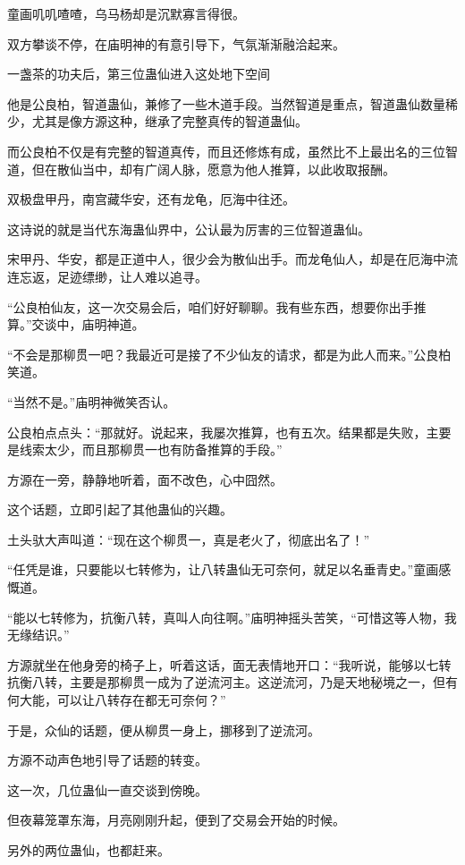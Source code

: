\begin{this_body}
童画叽叽喳喳，乌马杨却是沉默寡言得很。

双方攀谈不停，在庙明神的有意引导下，气氛渐渐融洽起来。

一盏茶的功夫后，第三位蛊仙进入这处地下空间

他是公良柏，智道蛊仙，兼修了一些木道手段。当然智道是重点，智道蛊仙数量稀少，尤其是像方源这种，继承了完整真传的智道蛊仙。

而公良柏不仅是有完整的智道真传，而且还修炼有成，虽然比不上最出名的三位智道，但在散仙当中，却有广阔人脉，愿意为他人推算，以此收取报酬。

双极盘甲丹，南宫藏华安，还有龙龟，厄海中往还。

这诗说的就是当代东海蛊仙界中，公认最为厉害的三位智道蛊仙。

宋甲丹、华安，都是正道中人，很少会为散仙出手。而龙龟仙人，却是在厄海中流连忘返，足迹缥缈，让人难以追寻。

“公良柏仙友，这一次交易会后，咱们好好聊聊。我有些东西，想要你出手推算。”交谈中，庙明神道。

“不会是那柳贯一吧？我最近可是接了不少仙友的请求，都是为此人而来。”公良柏笑道。

“当然不是。”庙明神微笑否认。

公良柏点点头：“那就好。说起来，我屡次推算，也有五次。结果都是失败，主要是线索太少，而且那柳贯一也有防备推算的手段。”

方源在一旁，静静地听着，面不改色，心中囧然。

这个话题，立即引起了其他蛊仙的兴趣。

土头驮大声叫道：“现在这个柳贯一，真是老火了，彻底出名了！”

“任凭是谁，只要能以七转修为，让八转蛊仙无可奈何，就足以名垂青史。”童画感慨道。

“能以七转修为，抗衡八转，真叫人向往啊。”庙明神摇头苦笑，“可惜这等人物，我无缘结识。”

方源就坐在他身旁的椅子上，听着这话，面无表情地开口：“我听说，能够以七转抗衡八转，主要是那柳贯一成为了逆流河主。这逆流河，乃是天地秘境之一，但有何大能，可以让八转存在都无可奈何？”

于是，众仙的话题，便从柳贯一身上，挪移到了逆流河。

方源不动声色地引导了话题的转变。

这一次，几位蛊仙一直交谈到傍晚。

但夜幕笼罩东海，月亮刚刚升起，便到了交易会开始的时候。

另外的两位蛊仙，也都赶来。


\end{this_body}
